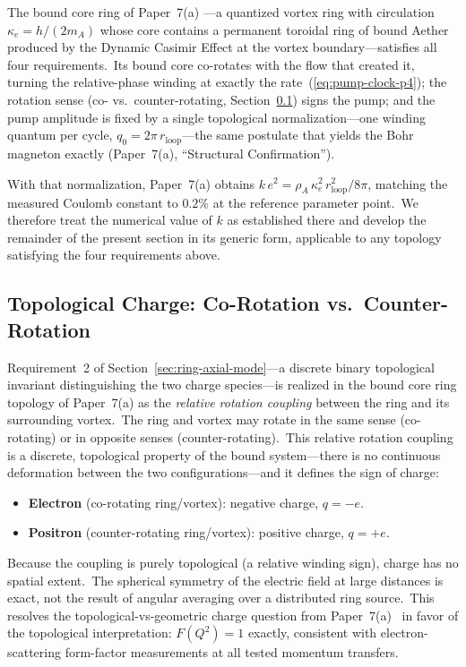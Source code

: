 ﻿\documentclass[12pt,letterpaper]{article}
\newcommand{\rhoa}{\rho_{\!A}}
\begin{document}
The bound core ring of Paper~7(a) \cite{otto-boundcore}---a quantized vortex
ring with circulation $\kappa_e = h/(2 m_A)$ whose core contains a permanent
toroidal ring of bound Aether produced by the Dynamic Casimir Effect at the
vortex boundary---satisfies all four requirements.\ Its bound core co-rotates
with the flow that created it, turning the relative-phase winding at exactly
the rate~(\ref{eq:pump-clock-p4}); the rotation sense (co- vs.\
counter-rotating, Section~\ref{sec:topological-charge}) signs the pump; and
the pump amplitude is fixed by a single topological normalization---one
winding quantum per cycle, $q_0 = 2\pi\,r_{\mathrm{loop}}$---the same
postulate that yields the Bohr magneton exactly (Paper~7(a), ``Structural
Confirmation'').

With that normalization, Paper~7(a) obtains
$k\,e^2 = \rhoa\,\kappa_e^2\,r_{\mathrm{loop}}^2/8\pi$, matching the measured
Coulomb constant to $0.2\%$ at the reference parameter point.\ We therefore
treat the numerical value of $k$ as established there and develop the
remainder of the present section in its generic form, applicable to any
topology satisfying the four requirements above.


\subsection{Topological Charge: Co-Rotation vs.\ Counter-Rotation}
\label{sec:topological-charge}

Requirement~2 of Section~\ref{sec:ring-axial-mode}---a discrete binary topological
invariant distinguishing the two charge species---is realized in the bound core
ring topology of Paper~7(a) as the \emph{relative rotation coupling} between the
ring and its surrounding vortex.\ The ring and vortex may rotate in the same sense
(co-rotating) or in opposite senses (counter-rotating).\ This relative rotation
coupling is a discrete, topological property of the bound system---there is no
continuous deformation between the two configurations---and it defines the sign of
charge:

\begin{itemize}[leftmargin=2em]
  \item \textbf{Electron} (co-rotating ring/vortex): negative charge, $q = -e$.
  \item \textbf{Positron} (counter-rotating ring/vortex): positive charge, $q = +e$.
\end{itemize}

Because the coupling is purely topological (a relative winding sign), charge has no
spatial extent.\ The spherical symmetry of the electric field at large distances is
exact, not the result of angular averaging over a distributed ring source.\ This
resolves the topological-vs-geometric charge question from
Paper~7(a)~\cite{otto-boundcore} in favor of the topological interpretation:
$F(Q^2) = 1$ exactly, consistent with electron-scattering form-factor measurements
at all tested momentum transfers.
\end{document}
